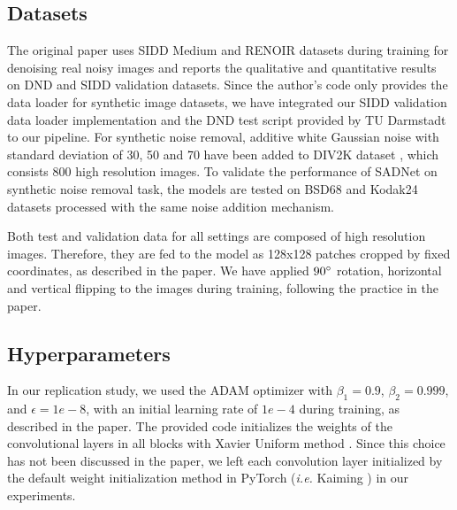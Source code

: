  \subsection{Datasets}
The original paper uses SIDD Medium \cite{SIDD_2018_CVPR} and RENOIR \cite{renoir} datasets during training for denoising real noisy images and reports the qualitative and quantitative results on DND \cite{8099777} and SIDD validation \cite{SIDD_2018_CVPR} datasets. Since the author's code only provides the data loader for synthetic image datasets, we have integrated our SIDD validation data loader implementation and the DND test script provided by TU Darmstadt \cite{8099777} to our pipeline. For synthetic noise removal, additive white Gaussian noise with standard deviation of 30, 50 and 70 have been added to DIV2K dataset \cite{Agustsson_2017_CVPR_Workshops}, which consists 800 high resolution images. To validate the performance of SADNet on synthetic noise removal task, the models are tested on BSD68 \cite{937655} and Kodak24 datasets processed with the same noise addition mechanism.
 
Both test and validation data for all settings are composed of high resolution images. Therefore, they are fed to the model as 128x128 patches cropped by fixed coordinates, as described in the paper. We have applied $90\degree$ rotation, horizontal and vertical flipping to the images during training, following the practice in the paper.




\subsection{Hyperparameters}

In our replication study, we used the ADAM optimizer \cite{kingma:adam} with $ \beta_{1} = 0.9$, $ \beta_{2} = 0.999$, and $\epsilon = 1e-8$, with an initial learning rate of $1e-4$ during training, as described in the paper. The provided code initializes the weights of the convolutional layers in all blocks with Xavier Uniform method \cite{Glorot2010UnderstandingTD}. Since this choice has not been discussed in the paper, we left each convolution layer initialized by the default weight initialization method in PyTorch (\textit{i.e.} Kaiming \cite{He2015DelvingDI}) in our experiments.


